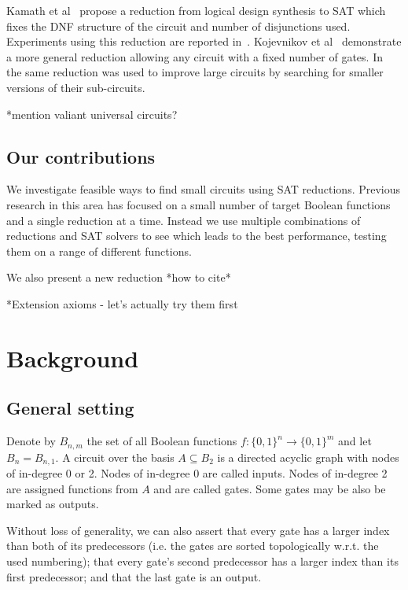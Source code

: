\documentclass{article}
\begin{document}
Kamath et al~\cite{kamath} propose a reduction from logical design synthesis to SAT which fixes the DNF structure of the circuit and number of disjunctions used. Experiments using this reduction are reported in~\cite{estrada}. Kojevnikov et al~\cite{kulikov} demonstrate a more general reduction allowing any circuit with a fixed number of gates. In~\cite{kulikovlocal} the same reduction was used to improve large circuits by searching for smaller versions of their sub-circuits.

*mention valiant universal circuits?

\subsection{Our contributions}

We investigate feasible ways to find small circuits using SAT reductions. Previous research in this area has focused on a small number of target Boolean functions and a single reduction at a time. Instead we use multiple combinations of reductions and SAT solvers to see which leads to the best performance, testing them on a range of different functions. 

We also present a new reduction *how to cite*

*Extension axioms - let’s actually try them first


\section{Background}

\subsection{General setting}

Denote by \(B_{n,m}\) the set of all Boolean functions \(f: \{0,1\}^n \to \{0,1\}^m\) and let \(B_n = B_{n,1}\). A circuit over the basis \(A \subseteq B_2\) is a directed acyclic graph with nodes of in-degree 0 or 2. Nodes of in-degree 0 are called inputs. Nodes of in-degree 2 are assigned functions from \(A\) and are called gates. Some gates may be also be marked as outputs.

Without loss of generality, we can also assert that every gate has a larger index than both of its predecessors (i.e. the gates are sorted topologically w.r.t. the used numbering); that every gate's second predecessor has a larger index than its first predecessor; and that the last gate is an output.~\cite{kulikov}
\end{document}
